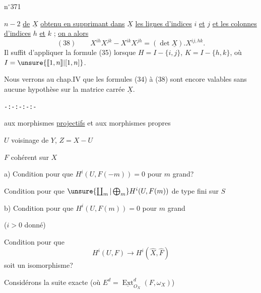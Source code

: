 
\hfill n$^\circ$371

$n-2$ \uline{de} $\underline X$ \uline{obtenu en supprimant dans} $\underline X$ \uline{les lignes d'indices} $i$ \uline{et} $j$ \uline{et les colonnes
d'indices} $h$ \uline{et} $k$ ; \uline{on a alors}
\[
(38)\qquad X^{ih}X^{jk}-X^{ik}X^{jh}=(\det\underline X).X^{ij,hk}.
\]
Il suffit d'appliquer la formule (35) lorsque $H=I-\{i,j\}$, $K=I-\{h,k\}$,
où $I=\unsure{[\![1,n]\!]|[1,n]}$.

Nous verrons au chap.IV que les formules (34) à (38) sont encore
valables sans aucune hypothèse sur la matrice carrée $\underline X$.

\begin{center}\texttt{-:-:-:-:-}\end{center}


 aux morphismes
\uline{ projectifs}
et aux morphismes propres


$U$ voisinage de $Y$, $Z=X-U$

$F$ cohérent sur $X$

a) Condition pour que $H^i(U,F(-m))=0$ pour $m$ grand?

 Condition pour que
$\unsure{\coprod_m|\bigoplus_m}H^i(U,F(m))$ de type fini sur $S$

b) Condition pour que $H^i(U,F(m))=0$ pour $m$ grand

($i>0$ donné)

 Condition pour que
\[
H^i(U,F)\longrightarrow H^i(\hat X,\hat F)
\]
soit un isomorphisme?

Considérons la suite exacte
(où $E^d=\underline{\operatorname{Ext}}^d_{O_X}(F,\omega_X)$)


